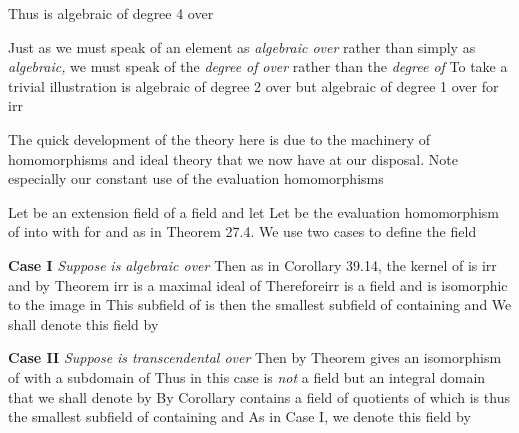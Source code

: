 \documentclass[11pt,oneside]{article}
\begin{document}
\begin{BookBody}
Thus  is algebraic of degree 4 over  \BookEnd{\blacktriangle}

Just as we must speak of an element \BookInline{\alpha } as\textit{ algebraic over}  rather than simply as \textit{algebraic,} we must speak of the\textit{ degree of} \BookInline{\alpha } \textit{over}  rather than the\textit{ degree of}  To take a trivial illustration is algebraic of degree 2 over  but algebraic of degree 1 over  for irr

The quick development of the theory here is due to the machinery of homomorphisms and ideal theory that we now have at our disposal. Note especially our constant use of the evaluation homomorphisms 


\noindent Let  be an extension field of a field  and let  Let \BookInline{\phi _{\alpha }} be the evaluation homomorphism of  into  with  for  and  as in Theorem 27.4. We use two cases to define the field 

\textbf{Case I} \textit{Suppose} \BookInline{\alpha } \textit{is algebraic over}  Then as in Corollary 39.14, the kernel of \BookInline{\phi _{\alpha }} is \BookInline{\langle }irr and by Theorem irr is a maximal ideal of  Thereforeirr is a field and is isomorphic to the image \BookInline{\phi _{\alpha }[F[x]]} in  This subfield \BookInline{\phi _{\alpha }[F[x]]} of  is then the smallest subfield of  containing  and  We shall denote this field by 

\textbf{Case II} \textit{Suppose} \BookInline{\alpha } \textit{is transcendental over}  Then by Theorem  gives an isomorphism of  with a subdomain of  Thus in this case \BookInline{\phi _{\alpha }[F[x]]} is\textit{ not} a field but an integral domain that we shall denote by  By Corollary  contains a field of quotients of  which is thus the smallest subfield of  containing  and  As in Case I, we denote this field by 


\end{BookBody}
\end{document}
